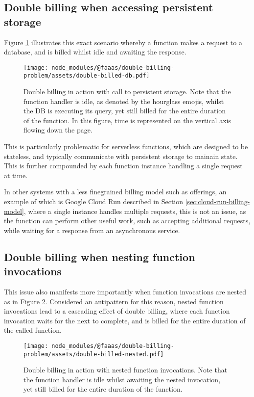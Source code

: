 \subsection{Double billing when accessing persistent storage}
Figure \ref{fig:double-billing-db} illustrates this exact scenario whereby a function makes a request to a database, and is billed whilst idle and awaiting the response.

\begin{figure}[t]
    \centering\texttt{[image: node\_modules/@faaas/double-billing-problem/assets/double-billed-db.pdf]}
    \caption{Double billing in action with call to persistent storage. Note that the function handler is idle, as denoted by the hourglass emojis, whilst the DB is executing its query, yet still billed for the entire duration of the function. In this figure, time is represented on the vertical axis flowing down the page.}
    \label{fig:double-billing-db}
\end{figure}

This is particularly problematic for serverless functions, which are designed to be stateless, and typically communicate with persistent storage to mainain state. This is further compounded by each function instance handling a single request at time.

In other systems with a less finegrained billing model such as \caas{} offerings, an example of which is Google Cloud Run described in Section \ref{sec:cloud-run-billing-model}, where a single instance handles multiple requests, this is not an issue, as the function can perform other useful work, such as accepting additional requests, while waiting for a response from an asynchronous service.

\subsection{Double billing when nesting function invocations}
This issue also manifests more importantly when function invocations are nested as in Figure \ref{fig:double-billing-nested}. Considered an antipattern for this reason\cite{LambdaFunctionsCalling}, nested function invocations lead to a cascading effect of double billing, where each function invocation waits for the next to complete, and is billed for the entire duration of the called function.

\begin{figure}[t]
    \texttt{[image: node\_modules/@faaas/double-billing-problem/assets/double-billed-nested.pdf]}
    \caption{Double billing in action with nested function invocations. Note that the function handler is idle whilst awaiting the nested invocation, yet still billed for the entire duration of the function.}
    \label{fig:double-billing-nested}
\end{figure}

